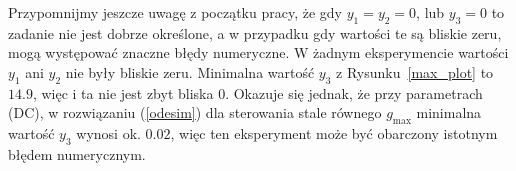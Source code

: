 \documentclass[11pt]{article}
\begin{document}
Przypomnijmy jeszcze uwagę z początku pracy, że gdy $y_1 = y_2 = 0$, lub $y_3 = 0$ to zadanie nie jest dobrze określone, a w przypadku gdy wartości te są bliskie zeru, mogą występować znaczne błędy numeryczne. W żadnym eksperymencie wartości $y_1$ ani $y_2$ nie były bliskie zeru. Minimalna wartość $y_3$ z Rysunku~\ref{max_plot} to $14.9$, więc i ta nie jest zbyt bliska 0. Okazuje się jednak, że przy parametrach (DC), w rozwiązaniu (\ref{odesim}) dla sterowania stale równego $g_{\max}$ minimalna wartość $y_3$ wynosi ok. $0.02$, więc ten eksperyment może być obarczony istotnym błędem numerycznym.

\newpage{}
{}

\end{document}
